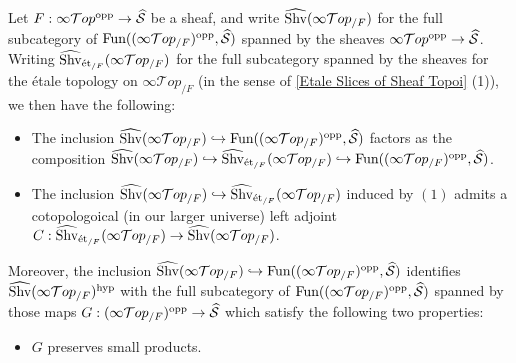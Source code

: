 \documentclass[10pt]{article}
\newcommand{\mS}{\mathcal S}
\newcommand{\cT}{\mathcal{T}}
\theoremstyle{witharg}
\theoremstyle{witharg}
\theoremstyle{witharg2}
\begin{document}
\begin{proposition}{}\label{Global Sheaves on Topoi Prop}

   Let $F:\infty\cT op^{\textnormal{opp}}\rightarrow \widehat{\mS}$ be a sheaf, and write $\widehat{\textnormal{Shv}}(\infty\cT op_{/F})$ for the full subcategory of $\textnormal{Fun}((\infty\cT op_{/F})^{\textnormal{opp}},\widehat{\mS})$ spanned by the sheaves $\infty\cT op^{\textnormal{opp}}\rightarrow \widehat{\mS}$. Writing $\widehat{\textnormal{Shv}}_{\textnormal{\'{e}t}_{/F}}(\infty\cT op_{/F})$ for the full subcategory spanned by the sheaves for the \'{e}tale topology on $\infty\cT op_{/F}$ (in the sense of \ref{Etale Slices of Sheaf Topoi} (1)), we then have the following:

    \begin{itemize}
    
        \item [$(1)$] The inclusion $\widehat{\textnormal{Shv}}(\infty\cT op_{/F})\hookrightarrow \textnormal{Fun}((\infty\cT op_{/F})^{\textnormal{opp}},\widehat{\mS})$ factors as the composition $\widehat{\textnormal{Shv}}(\infty\cT op_{/F})\hookrightarrow \widehat{\textnormal{Shv}}_{\textnormal{\'{e}t}_{/F}}(\infty\cT op_{/F})\hookrightarrow \textnormal{Fun}((\infty\cT op_{/F})^{\textnormal{opp}},\widehat{\mS})$. 

        \item [$(2)$] The inclusion $\widehat{\textnormal{Shv}}(\infty\cT op_{/F})\hookrightarrow \widehat{\textnormal{Shv}}_{\textnormal{\'{e}t}_{/F}}(\infty\cT op_{/F})$ induced by $(1)$ admits a cotopologoical (in our larger universe) left adjoint $C:\widehat{\textnormal{Shv}}_{\textnormal{\'{e}t}_{/F}}(\infty\cT op_{/F})\rightarrow \widehat{\textnormal{Shv}}(\infty\cT op_{/F})$. 
        
    \end{itemize}

    \noindent Moreover, the inclusion $\widehat{\textnormal{Shv}}(\infty\cT op_{/F})\hookrightarrow \textnormal{Fun}((\infty\cT op_{/F})^{\textnormal{opp}},\widehat{\mS})$ identifies $\widehat{\textnormal{Shv}}(\infty\cT op_{/F})^{\textnormal{hyp}}$ with the full subcategory of $\textnormal{Fun}((\infty\cT op_{/F})^{\textnormal{opp}},\widehat{\mS})$ spanned by those maps $G:(\infty\cT op_{/F})^{\textnormal{opp}}\rightarrow \widehat{\mS}$ which satisfy the following two properties:

    \begin{itemize}
        \item [$(\textnormal{i})$] $G$ preserves small products. 


\end{itemize}
\end{proposition}
\end{document}
